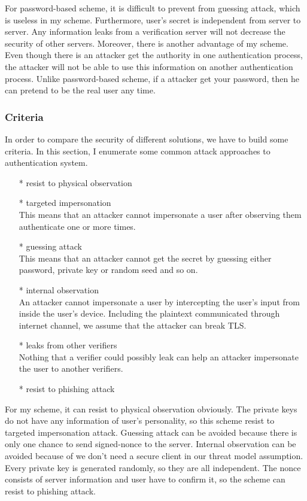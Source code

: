 \begin{CJK}{Bg5}{bsmi}
For password-based scheme, it is difficult to prevent from guessing attack, which is useless in my scheme. Furthermore, user's secret is independent from server to server. Any information leaks from a verification server will not decrease the security of other servers. Moreover, there is another advantage of my scheme. Even though there is an attacker get the authority in one authentication process, the attacker will not be able to use this information on another authentication process. Unlike password-based scheme, if a attacker get your password, then he can pretend to be the real user any time.

\subsubsection{Criteria}

In order to compare the security of different solutions, we have to build some criteria. In this section, I enumerate some common attack approaches to authentication system. 
\begin{enumerate}
\item[*] resist to physical observation
\item[*] targeted impersonation
\\This means that an attacker cannot impersonate a user after observing them authenticate one or more times.
\item[*] guessing attack
\\This means that an attacker cannot get the secret by guessing either password, private key or random seed and so on.
\item[*] internal observation
\\An attacker cannot impersonate a user by intercepting the user's input from inside the user's device. Including the plaintext communicated through internet channel, we assume that the attacker can break TLS.
\item[*] leaks from other verifiers
\\Nothing that a verifier could possibly leak can help an attacker impersonate the user to another verifiers.
\item[*] resist to phishing attack
\end{enumerate}

For my scheme, it can resist to physical observation obviously. The private keys do not have any information of user's personality, so this scheme resist to targeted impersonation attack. Guessing attack can be avoided because there is only one chance to send signed-nonce to the server. Internal observation can be avoided because of we don't need a secure client in our threat model assumption. Every private key is generated randomly, so they are all independent. The nonce consists of server information and user have to confirm it, so the scheme can resist to phishing attack.


\end{CJK}
